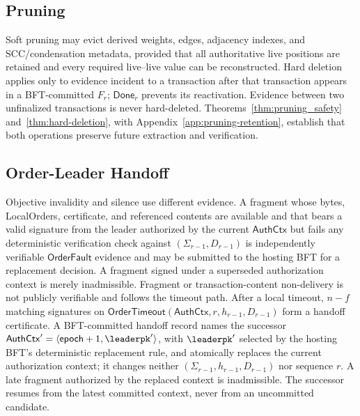 \subsection{Pruning}
\label{sec:protocol-pruning}

Soft pruning may evict derived weights, edges, adjacency indexes, and SCC/condensation metadata, provided that all authoritative live positions are retained and every required live--live value can be reconstructed. Hard
deletion applies only to evidence incident to a transaction after that transaction appears in a BFT-committed $F_r$; $\mathsf{Done}_r$ prevents its
reactivation.  Evidence between two unfinalized transactions is never hard-deleted.  Theorems~\ref{thm:pruning_safety} and~\ref{thm:hard-deletion}, with Appendix~\ref{app:pruning-retention}, establish that both operations preserve future extraction and verification.

\subsection{Order-Leader Handoff}
\label{sec:order-leader-handoff}

Objective invalidity and silence use different evidence.  A fragment whose bytes, LocalOrders, certificate, and referenced contents are available and that bears a valid signature from the leader authorized by the current
$\mathsf{AuthCtx}$ but fails any deterministic verification check against $(\Sigma_{r-1},D_{r-1})$ is independently verifiable $\mathsf{OrderFault}$ evidence and may be submitted to the hosting BFT for a replacement decision.
A fragment signed under a superseded authorization context is merely inadmissible. Fragment or transaction-content non-delivery is not publicly verifiable and follows the timeout path. After a local timeout, $n-f$ matching signatures on $\mathsf{OrderTimeout}(\mathsf{AuthCtx},r,h_{r-1},D_{r-1})$ form a handoff
certificate. A BFT-committed handoff record names the successor $\mathsf{AuthCtx}'=\langle\mathsf{epoch}+1,\leaderpk'\rangle$, with $\leaderpk'$ selected by the hosting BFT's deterministic replacement rule, and atomically replaces the current authorization context; it changes neither $(\Sigma_{r-1},h_{r-1},D_{r-1})$ nor sequence $r$. A late
fragment authorized by the replaced context is inadmissible. The successor resumes from the latest committed context, never from an uncommitted candidate.



